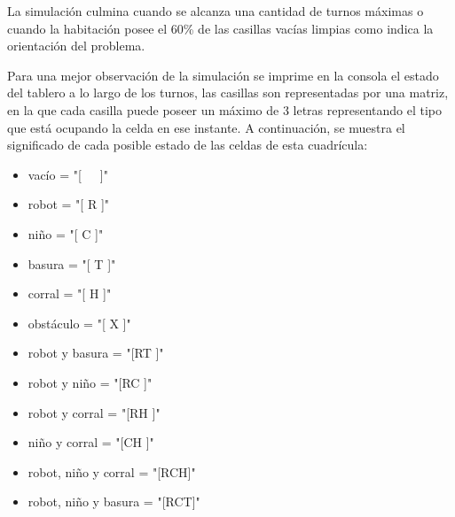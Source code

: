 \documentclass[titlepage,11pt]{scrartcl}
\begin{document}
La simulación culmina cuando se alcanza una cantidad de turnos máximas o cuando la habitación posee el 60\% de las casillas vacías limpias como indica la orientación del problema.

Para una mejor observación de la simulación se imprime en la consola el estado del tablero a lo largo de los turnos, las casillas son representadas por una matriz, en la que cada casilla puede poseer un máximo de 3 letras representando el tipo que está ocupando la celda en ese instante. A continuación, se muestra el significado de cada posible estado de las celdas de esta cuadrícula:

\begin{itemize}
    \item vacío = "[\ \ \ ]"
    \item robot = "[ R ]"
    \item niño = "[ C ]"
    \item basura = "[ T ]"
    \item corral = "[ H ]"
    \item obstáculo = "[ X ]"
    \item robot y basura = "[RT ]"
    \item robot y niño = "[RC ]"
    \item robot y corral = "[RH ]"
    \item niño y corral = "[CH ]"
    \item robot, niño y corral = "[RCH]"
    \item robot, niño y basura = "[RCT]"
\end{itemize}
\end{document}
